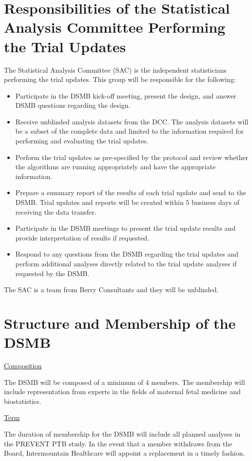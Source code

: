 \documentclass[12pt]{article}
\begin{document}
\section{Responsibilities of the Statistical Analysis Committee Performing the Trial Updates}
The Statistical Analysis Committee (SAC) is the independent statisticians 
performing the trial updates.  This group will be responsible for the 
following:
\begin{itemize}
\item Participate in the DSMB kick-off meeting, present the design, and answer DSMB questions regarding the design.
\item Receive unblinded analysis datasets from the DCC.  The analysis datasets will be a subset of the complete data and limited to the information required for performing and evaluating the trial updates.
\item Perform the trial updates as pre-specified by the protocol and review whether the algorithms are running appropriately and have the appropriate information.
\item Prepare a summary report of the results of each trial update and send to the DSMB.  Trial updates and reports will be created within 5 business days of receiving the data transfer.  
\item Participate in the DSMB meetings to present the trial update results and provide interpretation of results if requested.
\item Respond to any questions from the DSMB regarding the trial updates and perform additional analyses directly related to the trial update analyses if requested by the DSMB.
\end{itemize}

The SAC is a team from Berry Consultants and they will be unblinded.


\section{Structure and Membership of the DSMB}

\underline{Composition}

The DSMB will be composed of a minimum of 4 members. The membership will 
include representation from experts in the fields of maternal fetal medicine 
and biostatistics.

\vspace{0.4cm}
\noindent \underline{Term}

The duration of membership for the DSMB will include all planned analyses in 
the PREVENT PTB study. In the event that a member withdraws from the Board, 
Intermountain Healthcare will appoint a replacement in a timely fashion. 
\end{document}
